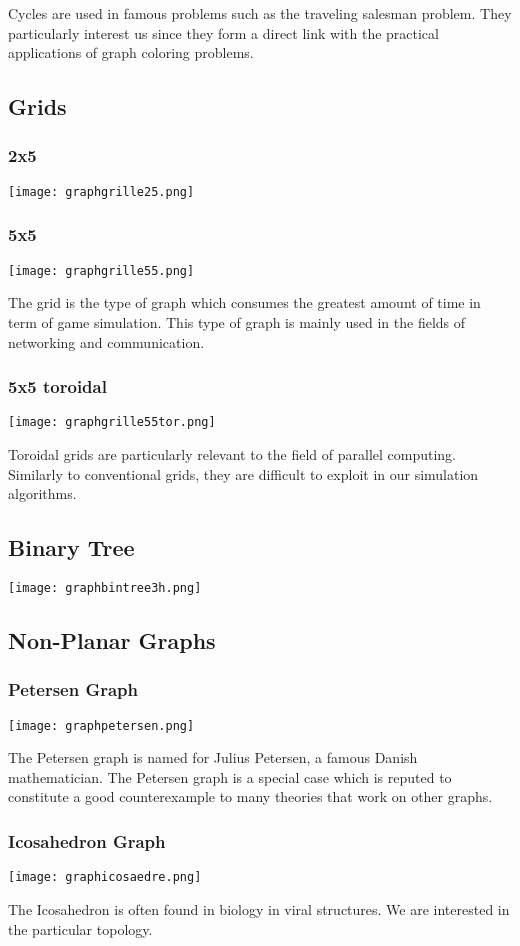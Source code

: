 Cycles are used in famous problems such as the traveling salesman problem. They particularly interest us since they form a direct link with the practical applications of graph coloring problems.

\subsection{Grids}

\subsubsection{2x5}

\texttt{[image: graphgrille25.png]}

\subsubsection{5x5}

\texttt{[image: graphgrille55.png]}

The grid is the type of graph which consumes the greatest amount of time in term of game simulation. This type of graph is mainly used in the fields of networking and communication.

\subsubsection{5x5 toroidal}

\texttt{[image: graphgrille55tor.png]}

Toroidal grids are particularly relevant to the field of parallel computing. Similarly to conventional grids, they are difficult to exploit in our simulation algorithms.

\subsection{Binary Tree}

\texttt{[image: graphbintree3h.png]}

\subsection{Non-Planar Graphs}

\subsubsection{Petersen Graph}

\texttt{[image: graphpetersen.png]}

The Petersen graph is named for Julius Petersen, a famous Danish mathematician. The Petersen graph is a special case which is reputed to constitute a good counterexample to many theories that work on other graphs. 

\subsubsection{Icosahedron Graph}

\texttt{[image: graphicosaedre.png]}

The Icosahedron is often found in biology in viral structures. We are interested in the particular topology.